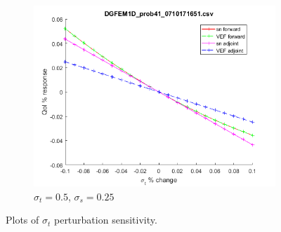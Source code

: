 \documentclass{article}
\newcommand{\sigt}{\sigma_t}
\newcommand{\sigs}{\sigma_s}
\begin{document}
\begin{figure}[H]
\begin{subfigure}{.5\textwidth}
  \centering
  \includegraphics[width=.8\linewidth]{figures/41sigtSens.png}
  \caption{$\sigt=0.5$, $\sigs=0.25$}
  \label{fig:sfig3}
\end{subfigure}
\caption{Plots of $\sigt$ perturbation sensitivity.}
\label{fig:fig}
\end{figure}
\end{document}

